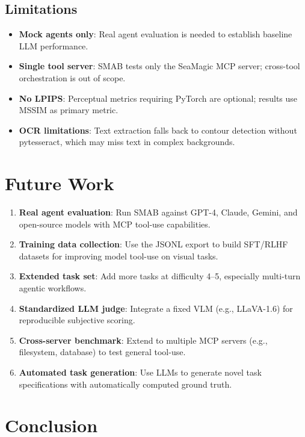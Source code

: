 \documentclass[11pt,a4paper]{article}
\begin{document}
\subsection{Limitations}

\begin{itemize}
    \item \textbf{Mock agents only}: Real agent evaluation is needed to establish baseline LLM performance.
    \item \textbf{Single tool server}: SMAB tests only the SeaMagic MCP server; cross-tool orchestration is out of scope.
    \item \textbf{No LPIPS}: Perceptual metrics requiring PyTorch are optional; results use MSSIM as primary metric.
    \item \textbf{OCR limitations}: Text extraction falls back to contour detection without pytesseract, which may miss text in complex backgrounds.
\end{itemize}

\section{Future Work}

\begin{enumerate}
    \item \textbf{Real agent evaluation}: Run SMAB against GPT-4, Claude, Gemini, and open-source models with MCP tool-use capabilities.
    \item \textbf{Training data collection}: Use the JSONL export to build SFT/RLHF datasets for improving model tool-use on visual tasks.
    \item \textbf{Extended task set}: Add more tasks at difficulty 4--5, especially multi-turn agentic workflows.
    \item \textbf{Standardized LLM judge}: Integrate a fixed VLM (e.g., LLaVA-1.6) for reproducible subjective scoring.
    \item \textbf{Cross-server benchmark}: Extend to multiple MCP servers (e.g., filesystem, database) to test general tool-use.
    \item \textbf{Automated task generation}: Use LLMs to generate novel task specifications with automatically computed ground truth.
\end{enumerate}

\section{Conclusion}
\end{document}
